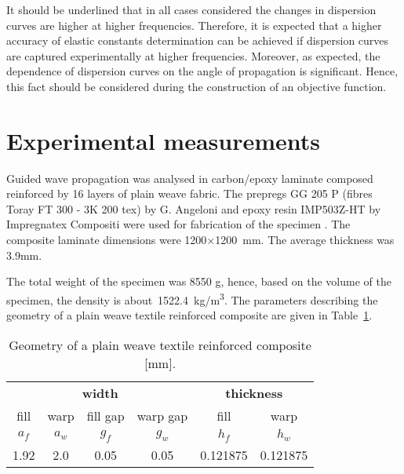 \documentclass[preprint,12pt]{elsarticle}
\providecommand{\DIFaddtex}[1]{{\protect\color{blue}\uwave{#1}}} %
\providecommand{\DIFaddbegin}{} %
\providecommand{\DIFaddend}{} %
\providecommand{\DIFadd}[1]{\texorpdfstring{\DIFaddtex{#1}}{#1}} %
\begin{document}
It should be underlined that in all cases considered the changes in dispersion curves are higher at higher frequencies. Therefore, it is expected that a higher accuracy of elastic constants determination can be achieved if dispersion curves are captured experimentally at higher frequencies. Moreover, as expected, the dependence of dispersion curves on the angle of propagation is significant. Hence, this fact should be considered during the construction of an objective function.
\section{Experimental measurements \label{sec:experiment}}
Guided wave propagation was analysed in carbon/epoxy laminate composed reinforced by 16 layers of plain weave fabric. The prepregs GG 205  P (fibres Toray FT 300 - 3K 200 tex) by G. Angeloni and epoxy resin IMP503Z-HT by Impregnatex Compositi were used for fabrication of the specimen \DIFaddbegin \DIFadd{in the autoclave}\DIFaddend . The composite laminate dimensions were 1200$\times$1200~mm. The average thickness was 3.9\DIFaddbegin \DIFadd{$\pm$0.1 }\DIFaddend mm. 

The total weight of the specimen was 8550 g, hence, based on the volume of the specimen, the density is about~1522.4~kg/m\textsuperscript{3}.
The parameters describing the geometry of a plain weave textile reinforced composite are given in Table~\ref{tab:weave_geo}. 
 \begin{table}[h]
	\renewcommand{\arraystretch}{1.3}
	\centering \footnotesize
	\caption{Geometry of a plain weave textile reinforced composite [mm].}
	\begin{tabular}{cccccc} 
		\toprule
		\multicolumn{4}{c}{\textbf{width} }	& \multicolumn{2}{c}{\textbf{thickness} }  \\ 
	    \cmidrule(lr){1-4} \cmidrule(lr){5-6} 
		fill & warp & fill gap& warp gap& fill & warp\\
		$a_f$ &$a_w$& $g_f$  & $g_w$  & $h_f$& $h_w$ \\ 
		\cmidrule(lr){1-2} \cmidrule(lr){3-4} \cmidrule(lr){5-6}
		1.92 &2.0& 0.05& 0.05 & 0.121875 & 0.121875 \\
		\bottomrule 
	\end{tabular} 
	\label{tab:weave_geo}
\end{table}
\end{document}
